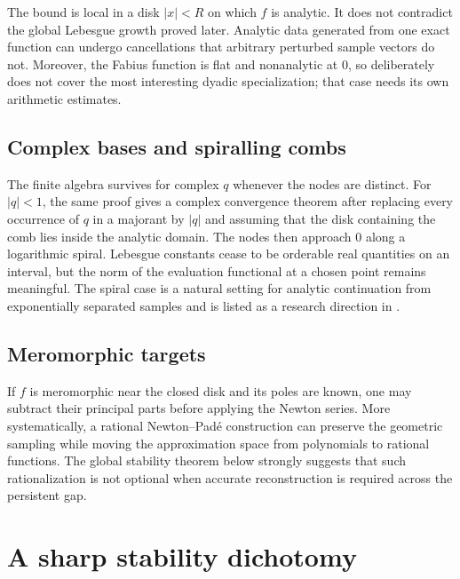 \begin{remark}
The bound is local in a disk $|x|<R$ on which $f$ is analytic.  It does not
contradict the global Lebesgue growth proved later.  Analytic data generated
from one exact function can undergo cancellations that arbitrary perturbed
sample vectors do not.  Moreover, the Fabius function is flat and
nonanalytic at $0$, so  deliberately
does not cover the most interesting dyadic specialization; that case needs
its own arithmetic estimates.
\end{remark}

\subsection{Complex bases and spiralling combs}

The finite algebra survives for complex $q$ whenever the nodes are distinct.
For $|q|<1$, the same proof gives a complex convergence theorem after
replacing every occurrence of $q$ in a majorant by $|q|$ and assuming that
the disk containing the comb lies inside the analytic domain.  The nodes
then approach $0$ along a logarithmic spiral.  Lebesgue constants cease to
be orderable real quantities on an interval, but the norm of the evaluation
functional at a chosen point remains meaningful.  The spiral case is a
natural setting for analytic continuation from exponentially separated
samples and is listed as a research direction in .

\subsection{Meromorphic targets}

If $f$ is meromorphic near the closed disk and its poles are known, one may
subtract their principal parts before applying the Newton series.  More
systematically, a rational Newton--Pad\'e construction can preserve the
geometric sampling while moving the approximation space from polynomials to
rational functions.  The global stability theorem below strongly suggests
that such rationalization is not optional when accurate reconstruction is
required across the persistent gap.

\section{A sharp stability dichotomy}
\label{gq:chap:stability}

